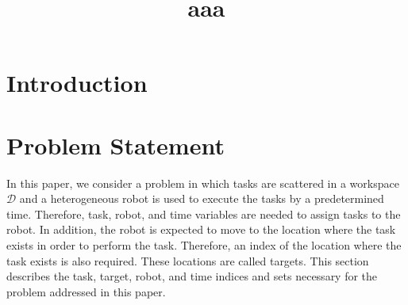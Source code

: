 \documentclass[]{interact}
\theoremstyle{plain}%
\theoremstyle{definition}
\theoremstyle{remark}
\begin{document}

\title{aaa}

\author{
}

\maketitle

\begin{abstract}

\end{abstract}

\begin{keywords}
\end{keywords}


\section{Introduction}

\section{Problem Statement}

In this paper, we consider a problem in which tasks are scattered in a workspace $\mathcal{D}$ and a heterogeneous robot is used to execute the tasks by a predetermined time.
Therefore, task, robot, and time variables are needed to assign tasks to the robot.
In addition, the robot is expected to move to the location where the task exists in order to perform the task. 
Therefore, an index of the location where the task exists is also required. These locations are called targets.
This section describes the task, target, robot, and time indices and sets necessary for the problem addressed in this paper.
\end{document}

